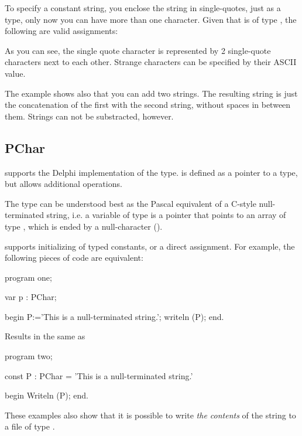 \documentclass{report}
\begin{document}
To specify a constant string, you enclose the string in single-quotes, just
as a  type, only now you can have more than one character.
Given that  is of type , the following are valid assignments: 
As you can see, the single quote character is represented by 2 single-quote
characters next to each other. Strange characters can be specified by their
ASCII value.

The example shows also that you can add two strings. The resulting string is
just the concatenation of the first with the second string, without spaces in
between them. Strings can not be substracted, however.

\subsection{PChar}

\fpc supports the Delphi implementation of the  type. 
is defined as a pointer to a  type, but allows additional
operations.

The  type can be understood best as the Pascal equivalent of a
C-style null-terminated string, i.e. a variable of type  is a 
pointer that points to an array of type , which is ended by a
null-character ().

\fpc supports initializing of  typed constants, or a direct
assignment. For example, the following pieces of code are equivalent:

\begin{listing}
program one;

var p : PChar;

begin
  P:='This is a null-terminated string.';
  writeln (P);
end.
\end{listing}
Results in the same as
\begin{listing}
program two;

const P : PChar = 'This is a null-terminated string.'

begin
  Writeln (P);
end.
\end{listing}

These examples also show that it is possible to write {\em the contents} of
the string to a file of type .
\end{document}
